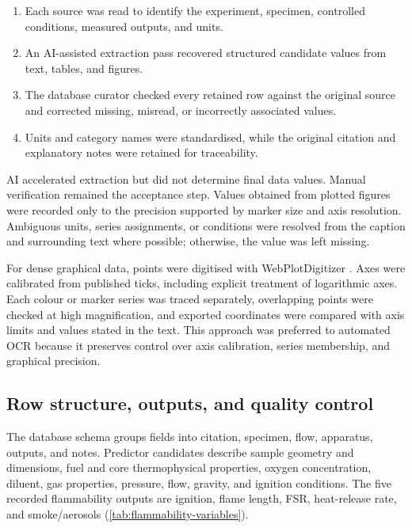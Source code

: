 \begin{enumerate}
  \item Each source was read to identify the experiment, specimen, controlled
  conditions, measured outputs, and units.

  \item An AI-assisted extraction pass recovered structured candidate values
  from text, tables, and figures.

  \item The database curator checked every retained row against the original
  source and corrected missing, misread, or incorrectly associated values.

  \item Units and category names were standardised, while the original citation
  and explanatory notes were retained for traceability.
\end{enumerate}

AI accelerated extraction but did not determine final data values. Manual
verification remained the acceptance step. Values obtained from plotted figures
were recorded only to the precision supported by marker size and axis
resolution. Ambiguous units, series assignments, or conditions were resolved
from the caption and surrounding text where possible; otherwise, the value was
left missing.

For dense graphical data, points were digitised with WebPlotDigitizer
\cite{webplotdigitizer}. Axes were calibrated from published ticks, including
explicit treatment of logarithmic axes. Each colour or marker series was traced
separately, overlapping points were checked at high magnification, and exported
coordinates were compared with axis limits and values stated in the text. This
approach was preferred to automated OCR because it preserves control over axis
calibration, series membership, and graphical precision.

\subsection{Row structure, outputs, and quality control}

The database schema groups fields into citation, specimen, flow, apparatus,
outputs, and notes. Predictor candidates describe sample geometry and
dimensions, fuel and core thermophysical properties, oxygen concentration,
diluent, gas properties, pressure, flow, gravity, and ignition conditions.
The five recorded flammability outputs are ignition, flame length, FSR,
heat-release rate, and smoke/aerosols
(\cref{tab:flammability-variables}).

